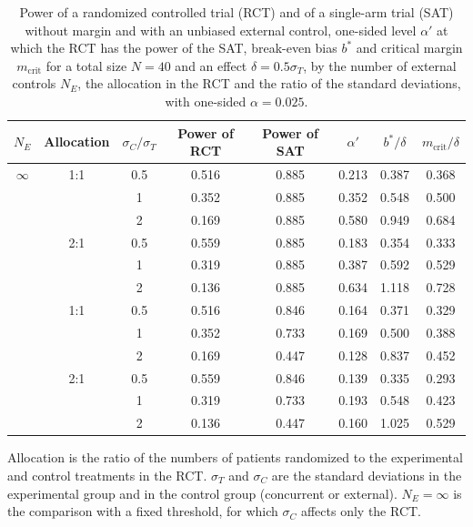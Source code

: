 \begin{table}[!htb]
\centering
\caption{Power of a randomized controlled trial (RCT) and of a single-arm trial (SAT) without margin and with an unbiased external control, one-sided level $\alpha'$ at which the RCT has the power of the SAT, break-even bias $b^{*}$ and critical margin $m_{\mathrm{crit}}$ for a total size $N = 40$ and an effect $\delta = 0.5\sigma_T$, by the number of external controls $N_E$, the allocation in the RCT and the ratio of the standard deviations, with one-sided $\alpha = 0.025$.}
\label{tab:sensitivity}
\begin{tabular}{cccccccc}
\toprule
$N_E$ & Allocation & $\sigma_C/\sigma_T$ & Power of RCT & Power of SAT & $\alpha'$ & $b^{*}/\delta$ & $m_{\mathrm{crit}}/\delta$ \\
\midrule
$\infty$ & 1:1 & 0.5 & 0.516 & 0.885 & 0.213 & 0.387 & 0.368 \\
 &  & 1 & 0.352 & 0.885 & 0.352 & 0.548 & 0.500 \\
 &  & 2 & 0.169 & 0.885 & 0.580 & 0.949 & 0.684 \\
 & 2:1 & 0.5 & 0.559 & 0.885 & 0.183 & 0.354 & 0.333 \\
 &  & 1 & 0.319 & 0.885 & 0.387 & 0.592 & 0.529 \\
 &  & 2 & 0.136 & 0.885 & 0.634 & 1.118 & 0.728 \\
\addlinespace
80 & 1:1 & 0.5 & 0.516 & 0.846 & 0.164 & 0.371 & 0.329 \\
 &  & 1 & 0.352 & 0.733 & 0.169 & 0.500 & 0.388 \\
 &  & 2 & 0.169 & 0.447 & 0.128 & 0.837 & 0.452 \\
 & 2:1 & 0.5 & 0.559 & 0.846 & 0.139 & 0.335 & 0.293 \\
 &  & 1 & 0.319 & 0.733 & 0.193 & 0.548 & 0.423 \\
 &  & 2 & 0.136 & 0.447 & 0.160 & 1.025 & 0.529 \\
\bottomrule
\end{tabular}
\par\smallskip
\begin{minipage}{0.95\linewidth}
\footnotesize
Allocation is the ratio of the numbers of patients randomized to the experimental and control treatments in the RCT. $\sigma_T$ and $\sigma_C$ are the standard deviations in the experimental group and in the control group (concurrent or external). $N_E = \infty$ is the comparison with a fixed threshold, for which $\sigma_C$ affects only the RCT.
\end{minipage}
\end{table}
